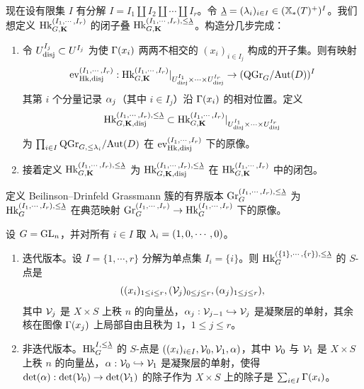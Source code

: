 现在设有限集 $I$ 有分解 $I=I_{1}\coprod I_{2}\coprod \cdots\coprod I_{r}$。令 $\underline{\lambda}=(\lambda_{i})_{i\in I}\in (\mathbb{X}_*(T)^{+})^{I}$。我们想定义 $\textup{Hk}^{(I_{1},\cdots, I_{r})}_{G,\mathbf{K}}$ 的闭子叠 $\textup{Hk}^{(I_{1},\cdots, I_{r}), \le \underline{\lambda}}_{G,\mathbf{K}}$。构造分几步完成：
\begin{enumerate}
\item 令 $U^{I_{j}}_{\mathrm{disj}}\subset U^{I_{j}}$ 为使 $\Gamma(x_{i})$ 两两不相交的 $(x_{i})_{i\in I_{j}}$ 构成的开子集。则有映射
\begin{equation}\label{ev disj}
\textup{ev}^{(I_{1},\cdots, I_{r})}_{\textup{Hk},\mathrm{disj}}: \textup{Hk}^{(I_{1},\cdots, I_{r})}_{G,\mathbf{K}}|_{U^{I_{1}}_{\mathrm{disj}}\times\cdots\times U^{I_{r}}_{\mathrm{disj}}}\to (\mathrm{QGr}_{G}/\textup{Aut}(D))^{I}
\end{equation}
其第 $i$ 个分量记录 $\alpha_{j}$（其中 $i\in I_{j}$）沿 $\Gamma(x_{i})$ 的相对位置。定义
\begin{equation*}
\textup{Hk}^{(I_{1},\cdots, I_{r}), \le \underline{\lambda}}_{G,\mathbf{K}, \mathrm{disj}}\subset \textup{Hk}^{(I_{1},\cdots, I_{r})}_{G,\mathbf{K}}|_{U^{I_{1}}_{\mathrm{disj}}\times\cdots\times U^{I_{r}}_{\mathrm{disj}}}
\end{equation*}
为 $\prod_{i\in I}\mathrm{QGr}_{G,\le \lambda_{i}}/\textup{Aut}(D)$ 在 $\textup{ev}^{(I_{1},\cdots, I_{r})}_{\textup{Hk},\mathrm{disj}}$ 下的原像。


\item 接着定义 $\textup{Hk}^{(I_{1},\cdots, I_{r}), \le \underline{\lambda}}_{G,\mathbf{K}}$ 为 $\textup{Hk}^{(I_{1},\cdots, I_{r}), \le \underline{\lambda}}_{G,\mathbf{K}, \mathrm{disj}}$ 在 $\textup{Hk}^{(I_{1},\cdots, I_{r})}_{G,\mathbf{K}}$ 中的闭包。
\end{enumerate}

定义 Beilinson–Drinfeld Grassmann 簇的有界版本 $\textup{Gr}^{(I_{1},\cdots, I_{r}), \le\underline{\lambda}}_{G}$ 为 $\textup{Hk}^{(I_{1},\cdots, I_{r}), \le\underline{\lambda}}_{G}$ 在典范映射 $\textup{Gr}^{(I_{1},\cdots, I_{r})}_{G}\to \textup{Hk}^{(I_{1},\cdots, I_{r})}_{G}$ 下的原像。

\begin{exam} 设 $G=\textup{GL}_{n}$，并对所有 $i\in I$ 取 $\lambda_{i}=(1,0,\cdots, 0)$。
\begin{enumerate}
\item 迭代版本。设 $I=\{1,\cdots, r\}$ 分解为单点集 $I_{i}=\{i\}$。则 $\textup{Hk}^{(\{1\},\cdots,\{ r\}),\le\underline{\lambda}}_{G}$ 的 $S$-点是
$$((x_{i})_{1\le i\le r}, (\mathcal{V}_{j})_{0\le j\le r}, (\alpha_{j})_{1\le j\le r}),$$
其中 $\mathcal{V}_{j}$ 是 $X\times S$ 上秩 $n$ 的向量丛，$\alpha_{j}: \mathcal{V}_{j-1}\hookrightarrow \mathcal{V}_{j}$ 是凝聚层的单射，其余核在图像 $\Gamma(x_{j})$ 上局部自由且秩为 $1$，$1\le j\le r$。

\item 非迭代版本。$\textup{Hk}^{I,\le\underline{\lambda}}_{G}$ 的 $S$-点是 $((x_{i})_{i\in I}, \mathcal{V}_{0}, \mathcal{V}_{1}, \alpha)$，其中 $\mathcal{V}_{0}$ 与 $\mathcal{V}_{1}$ 是 $X\times S$ 上秩 $n$ 的向量丛，$\alpha: \mathcal{V}_{0}\hookrightarrow \mathcal{V}_{1}$ 是凝聚层的单射，使得 $\det(\alpha): \det(\mathcal{V}_{0})\to \det(\mathcal{V}_{1})$ 的除子作为 $X\times S$ 上的除子是 $\sum_{i\in I}\Gamma(x_{i})$。
\end{enumerate}

\end{exam}


